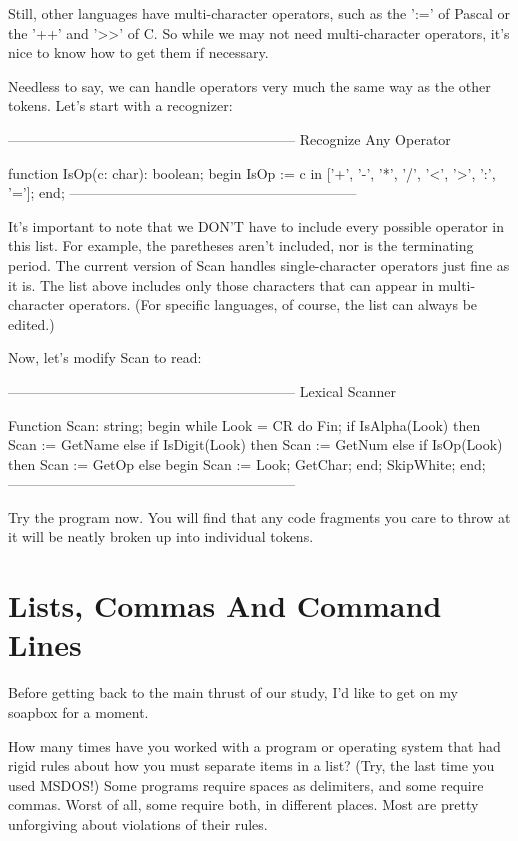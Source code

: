 \documentclass[float=false, crop=false]{standalone}
\begin{document}
Still, other languages have multi-character operators, such as the ':=' of
Pascal or the '++' and '>>' of C. So while we may not need multi-character
operators, it's nice to know how to get them if necessary.

Needless to say, we can handle operators very much the same way as the other
tokens. Let's start with a recognizer:

\begin{code}
{--------------------------------------------------------------}
{ Recognize Any Operator }

function IsOp(c: char): boolean;
begin
   IsOp := c in ['+', '-', '*', '/', '<', '>', ':', '='];
end;
{--------------------------------------------------------------}
\end{code}

It's important to note that we DON'T have to include every possible operator in
this list. For example, the paretheses aren't included, nor is the terminating
period. The current version of Scan handles single-character operators just fine
as it is. The list above includes only those characters that can appear in
multi-character operators. (For specific languages, of course, the list can
always be edited.)

Now, let's modify Scan to read:

\begin{code}
{--------------------------------------------------------------}
{ Lexical Scanner }

Function Scan: string;
begin
   while Look = CR do
      Fin;
   if IsAlpha(Look) then
      Scan := GetName
   else if IsDigit(Look) then
      Scan := GetNum
   else if IsOp(Look) then
      Scan := GetOp
   else begin
      Scan := Look;
      GetChar;
   end;
   SkipWhite;
end;
{--------------------------------------------------------------}
\end{code}

Try the program now. You will find that any code fragments you care to throw at
it will be neatly broken up into individual tokens.


\section{Lists, Commas And Command Lines}

Before getting back to the main thrust of our study, I'd like to get on my
soapbox for a moment.

How many times have you worked with a program or operating system that had rigid
rules about how you must separate items in a list? (Try, the last time you used
MSDOS!) Some programs require spaces as delimiters, and some require commas.
Worst of all, some require both, in different places. Most are pretty
unforgiving about violations of their rules.
\end{document}

